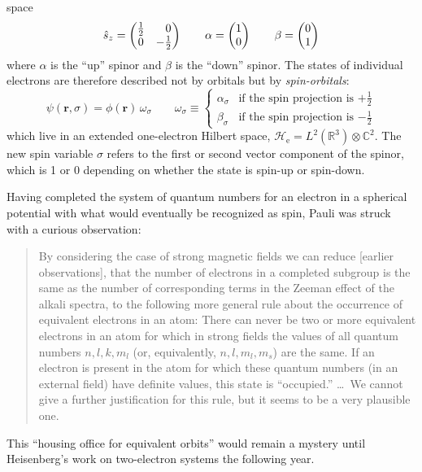 space
\begin{equation}
    \hat{s}_z
    =
    \begin{pmatrix}
        \tfrac{1}{2} & \hphantom{+}0 \\
        0 & -\tfrac{1}{2}
    \end{pmatrix}
    \qquad
    \alpha
    =
    \begin{pmatrix}
        1 \\ 0
    \end{pmatrix}
    \qquad
    \beta
    =
    \begin{pmatrix}
        0 \\ 1
    \end{pmatrix}
\end{equation}
where \(\alpha\) is the ``up'' spinor and \(\beta\) is the ``down'' spinor.
The states of individual electrons are therefore described not by orbitals but
by {\itshape spin-orbitals}:
\begin{equation}
    \psi(\mathbf{r}, \sigma)
    =
    \phi(\mathbf{r})\,
    \omega_\sigma
    \qquad
    \omega_\sigma
    \equiv
    \left\{
        \begin{array}{cl}
            \alpha_{\sigma}
            &
            \text{if the spin projection is \(+\tfrac{1}{2}\)}
            \\[10pt]
            \beta_{\sigma}
            &
            \text{if the spin projection is \(-\tfrac{1}{2}\)}
        \end{array}
    \right.
\end{equation}
which live in an extended one-electron Hilbert space,
\(
    \mathcal{H}_\mathrm{e}
    =
    L^2(\mathbb{R}^3)
    \otimes
    \mathbb{C}^2
\).
The new spin variable \(\sigma\) refers to the first or second vector component
of the spinor, which is 1 or 0 depending on whether the state is spin-up or
spin-down.

Having completed the system of quantum numbers for an electron in a spherical
potential with what would eventually be recognized as spin, Pauli was struck
with a curious observation:
\begin{quote}
    By considering the case of strong magnetic fields we can reduce [earlier
    observations], that the number of electrons in a completed subgroup is the
    same as the number of corresponding terms in the Zeeman effect of the alkali
    spectra, to the following more general rule about the occurrence of
    equivalent electrons in an atom:
    There can never be two or more equivalent electrons in an atom for which
    in strong fields the values of all quantum numbers \(n, l, k, m_l\) (or,
    equivalently, \(n, l, m_l, m_s\)) are the same.
    If an electron is present in the atom for which these quantum numbers
    (in an external field) have definite values, this state is ``occupied.''
    \dots\
    We cannot give a further justification for this rule, but it seems to be a
    very plausible one.\cite{Pauli:1925p756}
\end{quote}
This ``housing office for equivalent orbits''\cite{Mehra:1982} would remain a
mystery until Heisenberg's work on two-electron systems the following year.


